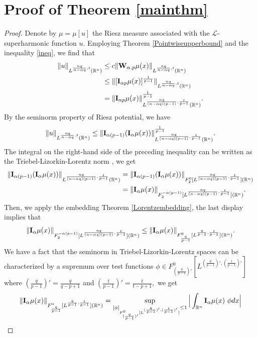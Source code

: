 \documentclass[12pt]{amsart}
\newcommand{\R}{\mathbb{R}}
\newcommand{\W}{{\bf{W}}}
\newcommand{\I}{{\bf{I}}}
\numberwithin{equation}{section}
\theoremstyle{plain}
\theoremstyle{definition}
\theoremstyle{remark}
\begin{document}
\section{Proof of Theorem \ref{mainthm}}\label{sec3}
\begin{proof}
Denote by $\mu=\mu[u]$  the Riesz measure associated with the $\mathcal{L}$-superharmonic function $u$. Employing Theorem \ref{Pointwiseupperbound} and the  inequality \eqref{ineq}, we find that
\begin{align*}
\|u\|_{L^{\frac{nq}{n-\alpha q},t}(\R^{n})}
&\leq c\|\W_{\alpha,p}\mu(x)\|_{L^{\frac{nq}{n-\alpha q},t}(\R^{n})}\\
&\leq\|[ \I_{\alpha p}\mu(x)]^{\frac{1}{p-1}}\|_{L^{\frac{nq}{n-\alpha q},t}(\R^{n})}\\
&=\|\I_{\alpha p}\mu(x)\|_{L^{\frac{nq}{(n-\alpha q)(p-1)},\frac{t}{p-1}}(\R^{n})}^{\frac{1}{p-1}}.
\end{align*}
By the seminorm property of Riesz potential, we have
\[
\|u\|_{L^{\frac{nq}{n-\alpha q},t}(\R^{n})}\leq \| \I_{\alpha (p-1)}(\I_{\alpha}\mu(x)) \|_{L^{\frac{nq}{(n-\alpha q)(p-1)},\frac{t}{p-1}}(\R^{n})}^{\frac{1}{p-1}}.
\]
The integral on the right-hand side of the preceding inequality can be written as the Triebel-Lizorkin-Lorentz norm \cite[Proposition 2.3.5] {Tr}, we get
\begin{align*}
\| \I_{\alpha (p-1)}(\I_{\alpha}\mu(x))\|_{L^{\frac{nq}{(n-\alpha q)(p-1)},\frac{t}{p-1}}(\R^{n})}
&=\| \I_{\alpha (p-1)}(\I_{\alpha}\mu(x))\|_{F^{0}_{2}[L^{\frac{nq}{(n-\alpha q)(p-1)},\frac{t}{p-1}}](\R^{n})}\\
&=\| \I_{\alpha}\mu(x)\|_{F^{-\alpha(p-1)}_{2}[L^{\frac{nq}{(n-\alpha q)(p-1)},\frac{t}{p-1}}](\R^{n})}.
\end{align*}
Then, we apply the embedding Theorem \ref{Lorentzembedding}, the last display implies that
\[
\| \I_{\alpha}\mu(x)\|_{F^{-\alpha(p-1)}_{2}[L^{\frac{nq}{(n-\alpha q)(p-1)},\frac{t}{p-1}}](\R^{n})}\leq \|\I_{\alpha}\mu(x)\|_{F^{0}_{\frac{q}{p-1}}[L^{\frac{q}{p-1},\frac{t}{p-1}}](\R^{n})}.
\]
We have a fact that the seminorm in Triebel-Lizorkin-Lorentz spaces can be characterized by a supremum over test functions $\phi \in F^{0}_{(\frac{q}{p-1})'}[L^{(\frac{q}{p-1})',(\frac{t}{p-1})'}]$ where $(\frac{q}{p-1})'=\frac{q}{q-p+1}$ and $(\frac{t}{p-1})'=\frac{t}{t-p+1},$ we get
\begin{align*}
\|\I_{\alpha}\mu(x)\|_{F^{0}_{\frac{q}{p-1}}[L^{\frac{q}{p-1},\frac{t}{p-1}}](\R^{n})}&=\sup_{[\phi]_{F^{0}_{(\frac{q}{p-1})'}[L^{(\frac{q}{p-1})',(\frac{t}{p-1})'}]}\leq 1}\Big|\int_{\R^{n}} \I_{\alpha}\mu(x)\ \phi dx\Big|\\

\end{align*}
\end{proof}
\end{document}
